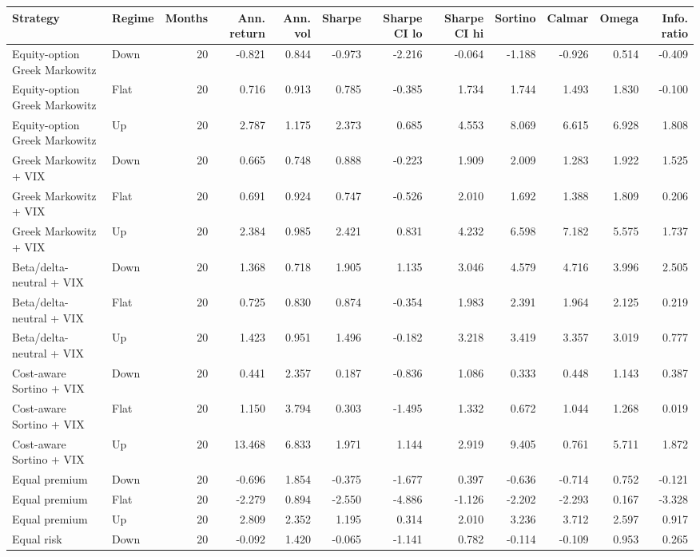 \begin{tabular}{llrrrrrrrrrr}
\toprule
Strategy & Regime & Months & Ann. return & Ann. vol & Sharpe & Sharpe CI lo & Sharpe CI hi & Sortino & Calmar & Omega & Info. ratio \\
\midrule
Equity-option Greek Markowitz & Down & 20 & -0.821 & 0.844 & -0.973 & -2.216 & -0.064 & -1.188 & -0.926 & 0.514 & -0.409 \\
Equity-option Greek Markowitz & Flat & 20 & 0.716 & 0.913 & 0.785 & -0.385 & 1.734 & 1.744 & 1.493 & 1.830 & -0.100 \\
Equity-option Greek Markowitz & Up & 20 & 2.787 & 1.175 & 2.373 & 0.685 & 4.553 & 8.069 & 6.615 & 6.928 & 1.808 \\
Greek Markowitz + VIX & Down & 20 & 0.665 & 0.748 & 0.888 & -0.223 & 1.909 & 2.009 & 1.283 & 1.922 & 1.525 \\
Greek Markowitz + VIX & Flat & 20 & 0.691 & 0.924 & 0.747 & -0.526 & 2.010 & 1.692 & 1.388 & 1.809 & 0.206 \\
Greek Markowitz + VIX & Up & 20 & 2.384 & 0.985 & 2.421 & 0.831 & 4.232 & 6.598 & 7.182 & 5.575 & 1.737 \\
Beta/delta-neutral + VIX & Down & 20 & 1.368 & 0.718 & 1.905 & 1.135 & 3.046 & 4.579 & 4.716 & 3.996 & 2.505 \\
Beta/delta-neutral + VIX & Flat & 20 & 0.725 & 0.830 & 0.874 & -0.354 & 1.983 & 2.391 & 1.964 & 2.125 & 0.219 \\
Beta/delta-neutral + VIX & Up & 20 & 1.423 & 0.951 & 1.496 & -0.182 & 3.218 & 3.419 & 3.357 & 3.019 & 0.777 \\
Cost-aware Sortino + VIX & Down & 20 & 0.441 & 2.357 & 0.187 & -0.836 & 1.086 & 0.333 & 0.448 & 1.143 & 0.387 \\
Cost-aware Sortino + VIX & Flat & 20 & 1.150 & 3.794 & 0.303 & -1.495 & 1.332 & 0.672 & 1.044 & 1.268 & 0.019 \\
Cost-aware Sortino + VIX & Up & 20 & 13.468 & 6.833 & 1.971 & 1.144 & 2.919 & 9.405 & 0.761 & 5.711 & 1.872 \\
Equal premium & Down & 20 & -0.696 & 1.854 & -0.375 & -1.677 & 0.397 & -0.636 & -0.714 & 0.752 & -0.121 \\
Equal premium & Flat & 20 & -2.279 & 0.894 & -2.550 & -4.886 & -1.126 & -2.202 & -2.293 & 0.167 & -3.328 \\
Equal premium & Up & 20 & 2.809 & 2.352 & 1.195 & 0.314 & 2.010 & 3.236 & 3.712 & 2.597 & 0.917 \\
Equal risk & Down & 20 & -0.092 & 1.420 & -0.065 & -1.141 & 0.782 & -0.114 & -0.109 & 0.953 & 0.265 \\

\end{tabular}
